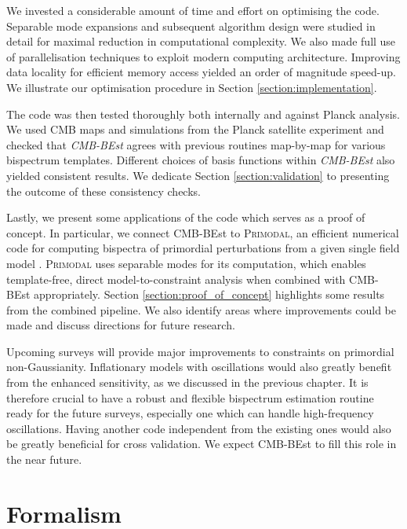 We invested a considerable amount of time and effort on optimising the code. Separable mode expansions and subsequent algorithm design were studied in detail for maximal reduction in computational complexity. We also made full use of parallelisation techniques to exploit modern computing architecture. Improving data locality for efficient memory access yielded an order of magnitude speed-up. We illustrate our optimisation procedure in Section \ref{section:implementation}.

The code was then tested thoroughly both internally and against Planck analysis. We used CMB maps and simulations from the Planck satellite experiment and checked that \textit{CMB-BEst} agrees with previous routines map-by-map for various bispectrum templates. Different choices of basis functions within \textit{CMB-BEst} also yielded consistent results. We dedicate Section \ref{section:validation} to presenting the outcome of these consistency checks.

Lastly, we present some applications of the code which serves as a proof of concept. In particular, we connect CMB-BEst to \textsc{Primodal}, an efficient numerical code for computing bispectra of primordial perturbations from a given single field model \cite{Clarke2021}. \textsc{Primodal} uses separable modes for its computation, which enables template-free, direct model-to-constraint analysis when combined with CMB-BEst appropriately. Section \ref{section:proof_of_concept} highlights some results from the combined pipeline. We also identify areas where improvements could be made and discuss directions for future research.

Upcoming surveys will provide major improvements to constraints on primordial non-Gaussianity. Inflationary models with oscillations would also greatly benefit from the enhanced sensitivity, as we discussed in the previous chapter. It is therefore crucial to have a robust and flexible bispectrum estimation routine ready for the future surveys, especially one which can handle high-frequency oscillations. Having another code independent from the existing ones would also be greatly beneficial for cross validation. We expect CMB-BEst to fill this role in the near future.


\section{Formalism}

